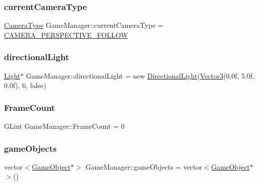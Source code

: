 \subsubsection{\texorpdfstring{current\+Camera\+Type}{currentCameraType}}
{\footnotesize\ttfamily \hyperlink{class_game_manager_a3f3a18cdc6b3c7c7565927e895eea247}{Camera\+Type} Game\+Manager\+::current\+Camera\+Type = \hyperlink{class_game_manager_a3f3a18cdc6b3c7c7565927e895eea247a2e83b11bc593230f7f30214b50fd6cae}{C\+A\+M\+E\+R\+A\+\_\+\+P\+E\+R\+S\+P\+E\+C\+T\+I\+V\+E\+\_\+\+F\+O\+L\+L\+OW}}

\mbox{\label{class_game_manager_a61953f70df310072a821385a7f768f99}} 
\subsubsection{\texorpdfstring{directional\+Light}{directionalLight}}
{\footnotesize\ttfamily \hyperlink{class_light}{Light}$\ast$ Game\+Manager\+::directional\+Light = new \hyperlink{class_directional_light}{Directional\+Light}(\hyperlink{class_vector3}{Vector3}(0.\+0f, 5.\+0f, 0.\+0f), 6, false)}

\mbox{\label{class_game_manager_a0d7672e0e14f75901291a62862d7eb60}} 
\subsubsection{\texorpdfstring{Frame\+Count}{FrameCount}}
{\footnotesize\ttfamily G\+Lint Game\+Manager\+::\+Frame\+Count = 0}

\mbox{\label{class_game_manager_a8b02c0a19f162a651041cddb4821a82c}} 
\subsubsection{\texorpdfstring{game\+Objects}{gameObjects}}
{\footnotesize\ttfamily vector$<$\hyperlink{class_game_object}{Game\+Object}$\ast$$>$ Game\+Manager\+::game\+Objects = vector$<$\hyperlink{class_game_object}{Game\+Object}$\ast$$>$()}

